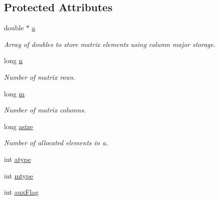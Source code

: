 \subsection*{Protected Attributes}
\begin{DoxyCompactItemize}
\item 
\hypertarget{classDMatrix_a3857b87c430ba8cc0113f0988daf6893}{
double $\ast$ \hyperlink{classDMatrix_a3857b87c430ba8cc0113f0988daf6893}{a}}
\label{classDMatrix_a3857b87c430ba8cc0113f0988daf6893}

\begin{DoxyCompactList}\small\item\em Array of doubles to store matrix elements using column major storage. \item\end{DoxyCompactList}\item 
\hypertarget{classDMatrix_a6b7668991ff7d01230b3599836a5d682}{
long \hyperlink{classDMatrix_a6b7668991ff7d01230b3599836a5d682}{n}}
\label{classDMatrix_a6b7668991ff7d01230b3599836a5d682}

\begin{DoxyCompactList}\small\item\em Number of matrix rows. \item\end{DoxyCompactList}\item 
\hypertarget{classDMatrix_a9cb55e3ad06f81025fed1ffbb0ae28bd}{
long \hyperlink{classDMatrix_a9cb55e3ad06f81025fed1ffbb0ae28bd}{m}}
\label{classDMatrix_a9cb55e3ad06f81025fed1ffbb0ae28bd}

\begin{DoxyCompactList}\small\item\em Number of matrix columns. \item\end{DoxyCompactList}\item 
\hypertarget{classDMatrix_af74d7ca8df8470885972d41500a27ff7}{
long \hyperlink{classDMatrix_af74d7ca8df8470885972d41500a27ff7}{asize}}
\label{classDMatrix_af74d7ca8df8470885972d41500a27ff7}

\begin{DoxyCompactList}\small\item\em Number of allocated elements in a. \item\end{DoxyCompactList}\item 
int \hyperlink{classDMatrix_a7d862f142821d27ff3ca0620170428ba}{atype}
\item 
int \hyperlink{classDMatrix_a1b72a6547b064c5e262e5db9389b34f4}{mtype}
\item 
\hypertarget{classDMatrix_a94587c0c67c81ca027a6fa0db7968dee}{
int \hyperlink{classDMatrix_a94587c0c67c81ca027a6fa0db7968dee}{auxFlag}}
\label{classDMatrix_a94587c0c67c81ca027a6fa0db7968dee}


\end{DoxyCompactItemize}
